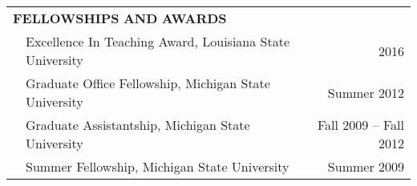 \documentclass[10pt]{article}
\begin{document}
\begin{center}
\begin{tabular}{llllr}
\multicolumn{5}{l}{{\Large \textbf{F}}\textbf{ELLOWSHIPS} \textbf{AND}
{\Large \textbf{A}}\textbf{WARDS}} \vspace{0.1cm}\\
& \multicolumn{3}{l}{Excellence In Teaching Award, Louisiana State University}& \multicolumn{1}{r}{2016} \\
& \multicolumn{3}{l}{Graduate Office Fellowship, Michigan State University}& \multicolumn{1}{r}{Summer 2012} \\
& \multicolumn{3}{l}{Graduate Assistantship, Michigan State University} &
\multicolumn{1}{r}{Fall 2009 -- Fall 2012}\\
& \multicolumn{3}{l}{Summer Fellowship, Michigan State University}& \multicolumn{1}{r}{Summer 2009} \\

\end{tabular}
\end{center}
\end{document}
